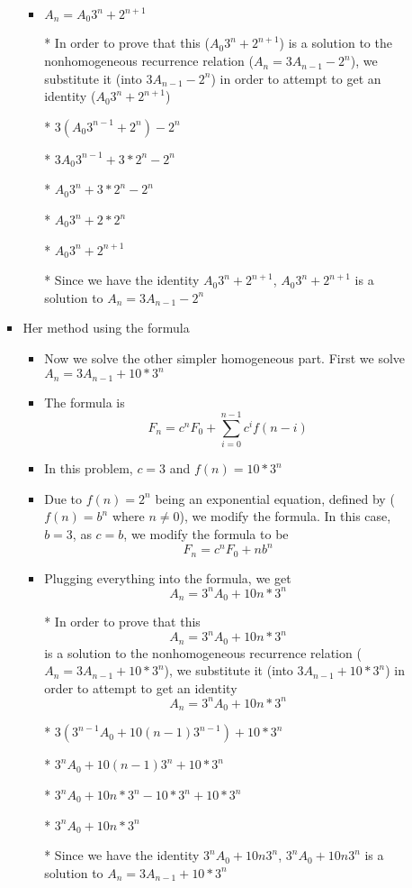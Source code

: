 \begin{enumerate}
\begin{enumerate}
\begin{itemize}
\begin{itemize}
      \item $A_{n}=A_{0}3^{n}+2^{n+1}$
      \item [*] In order to prove that this ($A_{0}3^{n}+2^{n+1}$) is a solution to the nonhomogeneous recurrence relation ($A_{n}=3A_{n-1}-2^{n}$), we substitute it (into $3A_{n-1}-2^{n}$) in order to attempt to get an identity ($A_{0}3^{n}+2^{n+1}$)
      \item [*] $3(A_{0}3^{n-1}+2^{n})-2^{n}$
      \item [*] $3A_{0}3^{n-1}+3*2^{n}-2^{n}$
      \item [*] $A_{0}3^{n}+3*2^{n}-2^{n}$
      \item [*] $A_{0}3^{n}+2*2^{n}$
      \item [*] $A_{0}3^{n}+2^{n+1}$
      \item [*] Since we have the identity $A_{0}3^{n}+2^{n+1}$, $A_{0}3^{n}+2^{n+1}$ is a solution to $A_{n}=3A_{n-1}-2^{n}$
      \end{itemize} %
    \item Her method using the formula
      \begin{itemize} %
      \item Now we solve the other simpler homogeneous part. First we solve $A_{n}=3A_{n-1}+10*3^{n}$
      \item The formula is $$F_{n}=c^{n}F_{0} + \sum\limits_{i=0}^{n-1}c^{i}f(n-i)$$
      \item In this problem, $c=3$ and $f(n)=10*3^{n}$
      \item Due to $f(n)=2^{n}$ being an exponential equation, defined by ($f(n)=b^{n}$ where $n\neq0$), we modify the formula. In this case, $b=3$, as $c=b$, we modify the formula to be $$F_{n}=c^{n}F_{0} + nb^{n}$$
      \item Plugging everything into the formula, we get $$A_{n}=3^{n}A_{0}+10n*3^{n}$$
      \item [*] In order to prove that this $$A_{n}=3^{n}A_{0}+10n*3^{n}$$ is a solution to the nonhomogeneous recurrence relation ($A_{n}=3A_{n-1}+10*3^{n}$), we substitute it (into $3A_{n-1}+10*3^{n}$) in order to attempt to get an identity $$A_{n}=3^{n}A_{0}+10n*3^{n}$$
      \item [*] $3(3^{n-1}A_{0}+10(n-1)3^{n-1})+10*3^{n}$
      \item [*] $3^{n}A_{0}+10(n-1)3^{n}+10*3^{n}$
      \item [*] $3^{n}A_{0}+10n*3^{n}-10*3^{n}+10*3^{n}$
      \item [*] $3^{n}A_{0}+10n*3^{n}$
      \item [*] Since we have the identity $3^{n}A_{0}+10n3^{n}$, $3^{n}A_{0}+10n3^{n}$ is a solution to $A_{n}=3A_{n-1}+10*3^{n}$

\end{itemize}
\end{itemize}
\end{enumerate}
\end{enumerate}
